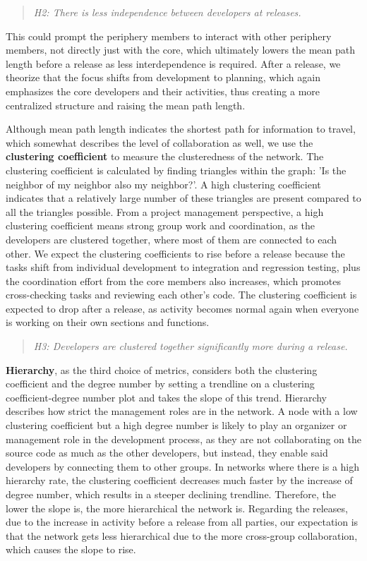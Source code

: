 \begin{quote}
    \textit{H2: There is less independence between developers at releases.}
\end{quote}

This could prompt the periphery members to interact with other periphery members, not directly just with the core, which ultimately lowers the mean path length before a release as less interdependence is required. After a release, we theorize that the focus shifts from development to planning, which again emphasizes the core developers and their activities, thus creating a more centralized structure and raising the mean path length.

Although mean path length indicates the shortest path for information to travel, which somewhat describes the level of collaboration as well, we use the \textbf{clustering coefficient} to measure the clusteredness of the network. The clustering coefficient is calculated by finding triangles within the graph: 'Is the neighbor of my neighbor also my neighbor?'. A high clustering coefficient indicates that a relatively large number of these triangles are present compared to all the triangles possible. From a project management perspective, a high clustering coefficient means strong group work and coordination, as the developers are clustered together, where most of them are connected to each other. We expect the clustering coefficients to rise before a release because the tasks shift from individual development to integration and regression testing, plus the coordination effort from the core members also increases, which promotes cross-checking tasks and reviewing each other's code. The clustering coefficient is expected to drop after a release, as activity becomes normal again when everyone is working on their own sections and functions.


\begin{quote}
    \textit{H3: Developers are clustered together significantly more during a release.}
\end{quote}


\textbf{Hierarchy}, as the third choice of metrics, considers both the clustering coefficient and the degree number by setting a trendline on a clustering coefficient-degree number plot and takes the slope of this trend. Hierarchy describes how strict the management roles are in the network. A node with a low clustering coefficient but a high degree number is likely to play an organizer or management role in the development process, as they are not collaborating on the source code as much as the other developers, but instead, they enable said developers by connecting them to other groups. In networks where there is a high hierarchy rate, the clustering coefficient decreases much faster by the increase of degree number, which results in a steeper declining trendline. Therefore, the lower the slope is, the more hierarchical the network is. Regarding the releases, due to the increase in activity before a release from all parties, our expectation is that the network gets less hierarchical due to the more cross-group collaboration, which causes the slope to rise. 

